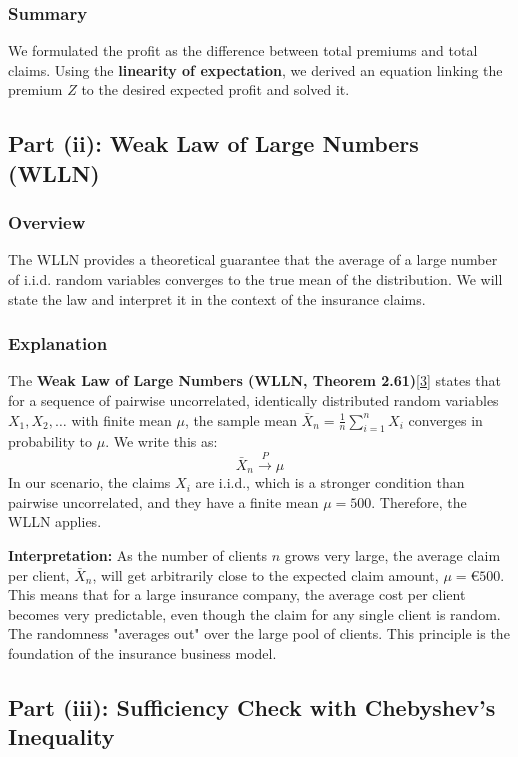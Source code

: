 \documentclass[11pt,a4paper]{article}
\begin{document}
\subsubsection{Summary}
We formulated the profit as the difference between total premiums and total claims. Using the \textbf{linearity of expectation}, we derived an equation linking the premium $Z$ to the desired expected profit and solved it.

\subsection{Part (ii): Weak Law of Large Numbers (WLLN)}

\subsubsection{Overview}
The WLLN provides a theoretical guarantee that the average of a large number of i.i.d. random variables converges to the true mean of the distribution. We will state the law and interpret it in the context of the insurance claims.

\subsubsection{Explanation}
The \textbf{Weak Law of Large Numbers (WLLN, Theorem 2.61)}\hyperlink{note3}{[3]} states that for a sequence of pairwise uncorrelated, identically distributed random variables $X_1, X_2, \dots$ with finite mean $\mu$, the sample mean $\bar{X}_n = \frac{1}{n}\sum_{i=1}^n X_i$ converges in probability to $\mu$. We write this as:
\[ \bar{X}_n \xrightarrow{P} \mu \]
In our scenario, the claims $X_i$ are i.i.d., which is a stronger condition than pairwise uncorrelated, and they have a finite mean $\mu = 500$. Therefore, the WLLN applies.

\textbf{Interpretation:} As the number of clients $n$ grows very large, the average claim per client, $\bar{X}_n$, will get arbitrarily close to the expected claim amount, $\mu = €500$. This means that for a large insurance company, the average cost per client becomes very predictable, even though the claim for any single client is random. The randomness "averages out" over the large pool of clients. This principle is the foundation of the insurance business model.

\subsection{Part (iii): Sufficiency Check with Chebyshev's Inequality}
\end{document}
